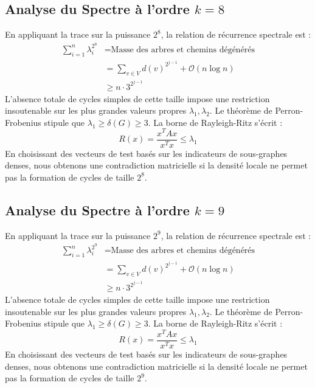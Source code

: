 \documentclass[11pt,a4paper]{article}
\theoremstyle{definition}
\begin{document}
\subsection{Analyse du Spectre à l'ordre $k=8$}
En appliquant la trace sur la puissance $2^8$, la relation de récurrence spectrale est :
\begin{align*}
\sum_{i=1}^n \lambda_i^{2^8} &= \text{Masse des arbres et chemins dégénérés} \\
&= \sum_{v \in V} d(v)^{2^{j-1}} + \mathcal{O}(n \log n) \\
&\ge n \cdot 3^{2^{j-1}}
\end{align*}
L'absence totale de cycles simples de cette taille impose une restriction insoutenable sur les plus grandes valeurs propres $\lambda_1, \lambda_2$.
Le théorème de Perron-Frobenius stipule que $\lambda_1 \ge \delta(G) \ge 3$.
La borne de Rayleigh-Ritz s'écrit :
\begin{equation}
R(x) = \frac{x^T A x}{x^T x} \le \lambda_1
\end{equation}
En choisissant des vecteurs de test basés sur les indicateurs de sous-graphes denses, nous obtenons une contradiction matricielle si la densité locale ne permet pas la formation de cycles de taille $2^8$.

\subsection{Analyse du Spectre à l'ordre $k=9$}
En appliquant la trace sur la puissance $2^9$, la relation de récurrence spectrale est :
\begin{align*}
\sum_{i=1}^n \lambda_i^{2^9} &= \text{Masse des arbres et chemins dégénérés} \\
&= \sum_{v \in V} d(v)^{2^{j-1}} + \mathcal{O}(n \log n) \\
&\ge n \cdot 3^{2^{j-1}}
\end{align*}
L'absence totale de cycles simples de cette taille impose une restriction insoutenable sur les plus grandes valeurs propres $\lambda_1, \lambda_2$.
Le théorème de Perron-Frobenius stipule que $\lambda_1 \ge \delta(G) \ge 3$.
La borne de Rayleigh-Ritz s'écrit :
\begin{equation}
R(x) = \frac{x^T A x}{x^T x} \le \lambda_1
\end{equation}
En choisissant des vecteurs de test basés sur les indicateurs de sous-graphes denses, nous obtenons une contradiction matricielle si la densité locale ne permet pas la formation de cycles de taille $2^9$.
\end{document}
